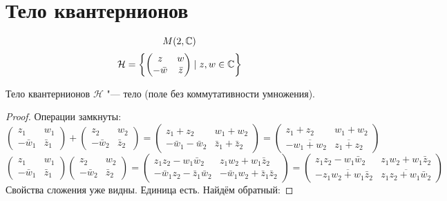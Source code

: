 \section{Тело квантернионов}

$$M(2, \mathbb{C})$$
$$\mathcal{H} = \left\{\left(\begin{matrix}z & w \\ -\bar w & \bar z\end{matrix}\right) \mid z, w \in \mathbb{C}\right\}$$

\begin{theorem}{Тело квантернионов}
$\mathcal{H}$ "--- тело (поле без коммутативности умножения).
\end{theorem}
\begin{proof}
Операции замкнуты:
$$\left(\begin{matrix}z_1 & w_1 \\ -\bar w_1 & \bar z_1\end{matrix}\right)+\left(\begin{matrix}z_2 & w_2 \\ -\bar w_2 & \bar z_2\end{matrix}\right) = \left(\begin{matrix}z_1+z_2 & w_1+w_2 \\ -\bar w_1-\bar w_2 & \bar z_1 + \bar z_2\end{matrix}\right) = \left(\begin{matrix}z_1+z_2 & w_1+w_2 \\ -\overline{w_1+w_2} & \overline{z_1+z_2}\end{matrix}\right)$$
$$\left(\begin{matrix}z_1 & w_1 \\ -\bar w_1 & \bar z_1\end{matrix}\right) \left(\begin{matrix}z_2 & w_2 \\ -\bar w_2 & \bar z_2\end{matrix}\right) = \left(\begin{matrix}z_1z_2 - w_1\bar w_2 & z_1 w_2+w_1 \bar z_2 \\ -\bar w_1z_2-\bar z_1\bar w_2 & -\bar w_1 w_2+\bar z_1\bar z_2\end{matrix}\right) = \left(\begin{matrix}z_1z_2 - w_1\bar w_2 & z_1 w_2+w_1 \bar z_2 \\ -\overline{z_1w_2+w_1\bar z_2} & \overline{z_1z_2+w_1\bar w_2}\end{matrix}\right)$$
Свойства сложения уже видны. Единица есть. Найдём обратный:

\end{proof}
